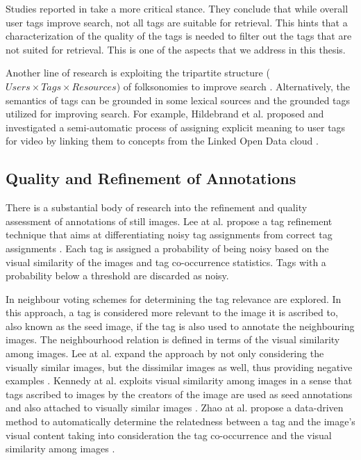 Studies reported in \cite{Bischoff:2008:TUS:1458082.1458112,Sun:2010:QTR:1873951.1874029} take a more critical stance. They conclude that while overall user tags improve search, not all tags are suitable for retrieval. This hints that a characterization of the quality of the tags is needed to filter out the tags that are not suited for retrieval. This is one of the aspects that we address in this thesis. 

Another line of research is exploiting the tripartite structure ($Users \times Tags \times Resources$) of folksonomies to improve search \cite{Hotho:2006:IRF:2094613.2094652,Bao:2007:OWS:1242572.1242640}. Alternatively, the semantics of tags can be grounded in some lexical sources and the grounded tags utilized for improving search. For example, Hildebrand et al. proposed and investigated a semi-automatic process of assigning explicit meaning to user tags for video by linking them to concepts from the Linked Open Data cloud \cite{michiel}.

\subsection{Quality and Refinement of Annotations}
There is a substantial body of research into the refinement and quality assessment of annotations of still images. Lee at al. propose a tag refinement technique that aims at
differentiating noisy tag assignments from correct tag assignments \cite{Lee:2010:TRI:1890924.1891010}. Each tag is assigned a probability of being noisy based on the visual similarity of the images and tag co-occurrence statistics. Tags with a probability below a threshold are discarded as noisy. 

In \cite{Truong:2012:CSK:2324796.2324808,Li:2008:LTR:1460096.1460126} neighbour voting schemes for determining the tag relevance are explored. In this approach, a tag is considered more relevant to the image it is ascribed to, also known as the seed image, if the tag is also used to annotate the neighbouring images. The neighbourhood relation is defined in terms of the visual similarity among images. Lee at al. expand the approach by not only considering the visually similar images, but the dissimilar images as well, thus providing negative examples \cite{Lee:2012:TDE:2390876.2390880}. Kennedy at al. exploits visual similarity among images in a sense that tags ascribed to images by the creators of the image are used as seed annotations and also attached to visually similar images \cite{Kennedy:2009:RTU:1631135.1631139}. Zhao at al. propose a data-driven method to automatically determine the relatedness between a tag and the image's visual content taking into consideration the tag co-occurrence and the visual similarity among images \cite{Zhao:2010:TRV:2174490.2174571}.

